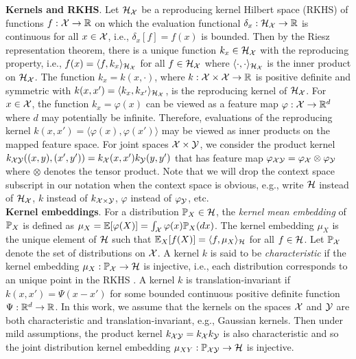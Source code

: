 \textbf{Kernels and RKHS}. Let $\calH_\calX$ be a reproducing kernel Hilbert space (RKHS) of functions $f:\calX\rightarrow\bbR$ on which the evaluation functional $\delta_x:\calH_\calX\rightarrow\bbR$ is continuous for all $x\in\calX$, i.e., $\delta_x[f]=f(x)$ is bounded. Then by the Riesz representation theorem, there is a unique function $k_x\in\calH_\calX$ with the reproducing property, i.e., $f(x)=\langle f,k_x\rangle_{\calH_\calX}$ for all $f\in\calH_\calX$ where $\langle\cdot,\cdot\rangle_{\calH_\calX}$ is the inner product on $\calH_{\calX}$. The function $k_x=k(x,\cdot)$, where $k:\calX\times\calX\rightarrow\bbR$ is positive definite and symmetric with $k(x,x')=\langle k_x,k_{x'}\rangle_{\calH_\calX}$, is the reproducing kernel of $\calH_\calX$. For $x\in\calX$, the function $k_x=\varphi(x)$ can be viewed as a feature map $\varphi:\calX\rightarrow\bbR^d$ where $d$ may potentially be infinite. Therefore, evaluations of the reproducing kernel $k(x,x')=\langle \varphi(x),\varphi(x')\rangle$ may be viewed as inner products on the mapped feature space. For joint spaces $\calX\times\calY$, we consider the product kernel $k_{\calX\calY}((x,y),(x',y'))=k_\calX(x,x')k_\calY(y,y')$ that has feature map $\varphi_{\calX\calY}=\varphi_\calX\otimes\varphi_\calY$ where $\otimes$ denotes the tensor product. Note that we will drop the context space subscript in our notation when the context space is obvious, e.g., write $\calH$ instead of $\calH_\calX$, $k$ instead of $k_{\calX\times\calY}$, $\varphi$ instead of $\varphi_\calY$, etc.
\\

\textbf{Kernel embeddings}. For a distribution $\P_X\in\calH$, the \textit{kernel mean embedding} of $\P_X$ is defined as $\mu_X=\E[\varphi(X)]=\int_\calX\varphi(x)\P_X(dx)$. The kernel embedding $\mu_X$ is the unique element of $\calH$ such that $\E_X[f(X)]=\langle f,\mu_X\rangle_\calH$ for all $f\in\calH$. Let $\P_\calX$ denote the set of distributions on $\calX$. A kernel $k$ is said to be \textit{characteristic} if the kernel embedding $\mu_X:\P_\calX\rightarrow\calH$ is injective, i.e., each distribution corresponds to an unique point in the RKHS \parencite{Fukumizu:2007}. A kernel $k$ is translation-invariant if $k(x,x') = \Psi(x-x')$ for some bounded continuous positive definite function $\Psi:\bbR^d\rightarrow\bbR$. In this work, we assume that the kernels on the spaces $\calX$ and $\calY$ are both characteristic and translation-invariant, e.g., Gaussian kernels. Then under mild assumptions, the product kernel $k_{\calX\calY}=k_\calX k_\calY$ is also characteristic \parencite[Corollary 11]{Sriperumbudur:2010} and so the joint distribution kernel embedding $\mu_{XY}:\P_{\calX\calY}\rightarrow\calH$ is injective.
\\

